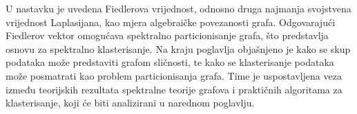 U nastavku je uvedena Fiedlerova vrijednost, odnosno druga najmanja svojstvena vrijednost Laplasijana, kao mjera algebraičke povezanosti grafa. Odgovarajući Fiedlerov vektor omogućava spektralno particionisanje grafa, što predstavlja osnovu za spektralno klasterisanje.
Na kraju poglavlja objašnjeno je kako se skup podataka može predstaviti grafom sličnosti, te kako se klasterisanje podataka može posmatrati kao problem particionisanja grafa. Time je uspostavljena veza između teorijskih rezultata spektralne teorije grafova i praktičnih algoritama za klasterisanje, koji će biti analizirani u narednom poglavlju.
